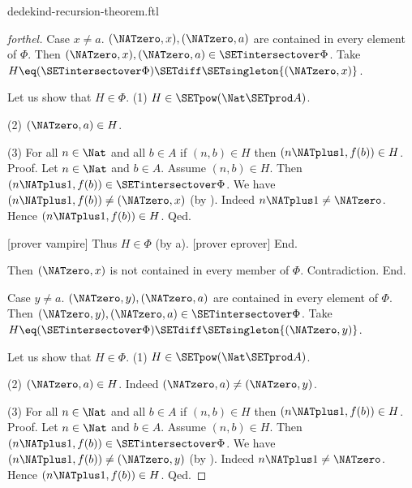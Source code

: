 \documentclass{naproche-library}
\begin{document}
\begin{smodule}[title=Dedekind's Recursion Theorem]{dedekind-recursion-theorem.ftl}
\begin{proof}[forthel]
          Case $x \neq a$.
            $(\NATzero,x), (\NATzero,a)$ are contained in every element of $\Phi$.
            Then $(\NATzero,x), (\NATzero,a) \in \SETintersectover \Phi$.
            Take $H \eq (\SETintersectover \Phi) \SETdiff \SETsingleton{(\NATzero,x)}$.

            Let us show that $H \in \Phi$.
              (1) $H \in \SETpow(\Nat \SETprod A)$.

              (2) $(\NATzero,a) \in H$.

              (3) For all $n \in \Nat$ and all $b \in A$ if
              $(n,b) \in H$ then $(n \NATplus 1, f(b)) \in H$. \newline
              Proof.
                Let $n \in \Nat$ and $b \in A$.
                Assume $(n,b) \in H$.
                Then $(n \NATplus 1, f(b)) \in \SETintersectover \Phi$.
                We have $(n \NATplus 1, f(b)) \neq (\NATzero,x)$ (by ).
                Indeed $n \NATplus 1 \neq \NATzero$.
                Hence $(n \NATplus 1, f(b)) \in H$.
              Qed.

              [prover vampire]
              Thus $H \in \Phi$ (by a).
              [prover eprover]
            End.

            Then $(\NATzero,x)$ is not contained in every member of $\Phi$.
            Contradiction.
          End.

          Case $y \neq a$.
            $(\NATzero,y), (\NATzero,a)$ are contained in every element of $\Phi$.
            Then $(\NATzero,y), (\NATzero,a) \in \SETintersectover \Phi$.
            Take $H \eq (\SETintersectover \Phi) \SETdiff \SETsingleton{(\NATzero,y)}$.

            Let us show that $H \in \Phi$.
              (1) $H \in \SETpow(\Nat \SETprod A)$.

              (2) $(\NATzero,a) \in H$.
              Indeed $(\NATzero,a) \neq (\NATzero,y)$.

              (3) For all $n \in \Nat$ and all $b \in A$ if
              $(n,b) \in H$ then $(n \NATplus 1, f(b)) \in H$. \newline
              Proof.
                Let $n \in \Nat$ and $b \in A$.
                Assume $(n,b) \in H$.
                Then $(n \NATplus 1, f(b)) \in \SETintersectover \Phi$.
                We have $(n \NATplus 1, f(b)) \neq (\NATzero,y)$ (by ).
                Indeed $n \NATplus 1 \neq \NATzero$.
                Hence $(n \NATplus 1, f(b)) \in H$.
              Qed.


\end{proof}
\end{smodule}
\end{document}
